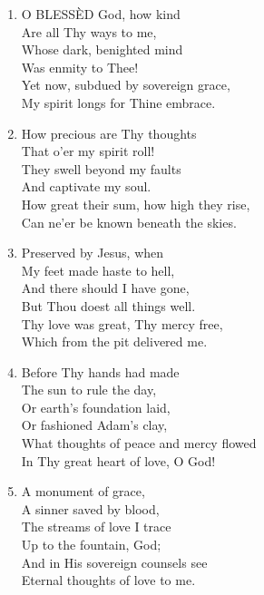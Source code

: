 \begin{enumerate}
    \item O BLESS\`ED God, how kind \\
        Are all Thy ways to me, \\
        Whose dark, benighted mind \\
        Was enmity to Thee! \\
        Yet now, subdued by sovereign grace, \\
        My spirit longs for Thine embrace.

    \item How precious are Thy thoughts \\
        That o'er my spirit roll! \\
        They swell beyond my faults \\
        And captivate my soul. \\
        How great their sum, how high they rise, \\
        Can ne'er be known beneath the skies.

    \item Preserved by Jesus, when \\
        My feet made haste to hell, \\
        And there should I have gone, \\
        But Thou doest all things well. \\
        Thy love was great, Thy mercy free, \\
        Which from the pit delivered me.

    \item Before Thy hands had made \\
        The sun to rule the day, \\
        Or earth's foundation laid, \\
        Or fashioned Adam's clay, \\
        What thoughts of peace and mercy flowed \\
        In Thy great heart of love, O God!

    \item A monument of grace, \\
        A sinner saved by blood, \\
        The streams of love I trace \\
        Up to the fountain, God; \\
        And in His sovereign counsels see \\
        Eternal thoughts of love to me.

\end{enumerate}

